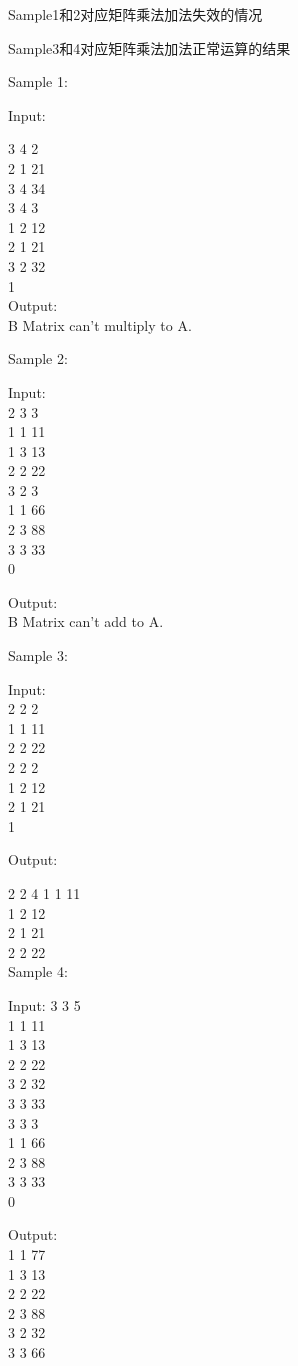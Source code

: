 Sample1和2对应矩阵乘法加法失效的情况

Sample3和4对应矩阵乘法加法正常运算的结果

Sample 1:

   Input:

   3 4 2\\
   2 1 21\\
   3 4 34\\
   3 4 3\\
   1 2 12\\
   2 1 21\\
   3 2 32\\
   1\\


   Output:\\
   B Matrix can't multiply to A.


Sample 2:

   Input:\\
   2 3 3\\
   1 1 11\\
   1 3 13\\
   2 2 22\\
   3 2 3\\
   1 1 66\\
   2 3 88\\
   3 3 33\\
   0


   Output:\\
   B Matrix can't add to A.


Sample 3:

   Input:\\
   2 2 2\\
   1 1 11\\
   2 2 22\\
   2 2 2\\
   1 2 12\\
   2 1 21\\
   1


   Output:

   2 2 4
   1 1 11\\
   1 2 12\\
   2 1 21\\
   2 2 22\\

Sample 4:

   Input:
   3 3 5\\
   1 1 11\\
   1 3 13\\
   2 2 22\\
   3 2 32\\
   3 3 33\\
   3 3 3\\
   1 1 66\\
   2 3 88\\
   3 3 33\\
   0


   Output:\\
   1 1 77\\
   1 3 13\\
   2 2 22\\
   2 3 88\\
   3 2 32\\
   3 3 66